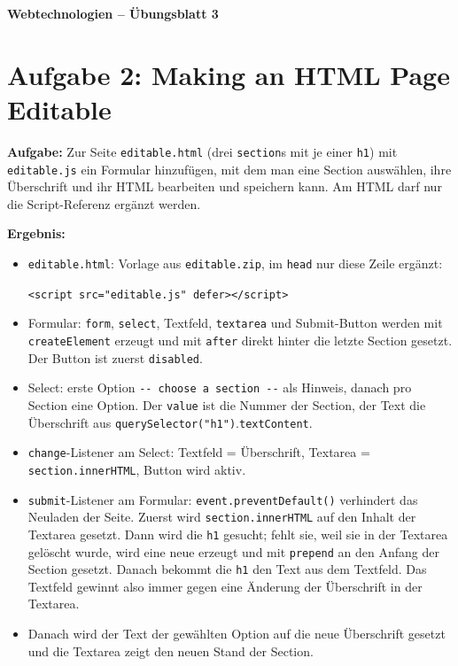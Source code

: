 \documentclass[11pt,a4paper]{article}
\begin{document}
\begin{center}
  {\Large\textbf{Webtechnologien -- Übungsblatt 3}}
\end{center}
\section*{Aufgabe 2: Making an HTML Page Editable}
\textbf{Aufgabe:} Zur Seite \texttt{editable.html} (drei
\texttt{section}s mit je einer \texttt{h1}) mit \texttt{editable.js} ein
Formular hinzufügen, mit dem man eine Section auswählen, ihre Überschrift
und ihr HTML bearbeiten und speichern kann. Am HTML darf nur die
Script-Referenz ergänzt werden.

\medskip
\textbf{Ergebnis:}
\begin{itemize}
  \item \texttt{editable.html}: Vorlage aus \texttt{editable.zip}, im
    \texttt{head} nur diese Zeile ergänzt:
    \begin{center}
    \texttt{<script src="editable.js" defer></script>}
    \end{center}
  \item Formular: \texttt{form}, \texttt{select}, Textfeld,
    \texttt{textarea} und Submit-Button werden mit
    \texttt{createElement} erzeugt und mit \texttt{after} direkt hinter die letzte Section gesetzt.
    Der Button ist zuerst \texttt{disabled}.
  \item Select: erste Option \glqq\texttt{-{}- choose a section -{}-}\grqq{}
    als Hinweis, danach pro Section eine Option. Der \texttt{value} ist
    die Nummer der Section, der Text die Überschrift aus
    \texttt{querySelector("h1")}.\allowbreak\texttt{textContent}.
  \item \texttt{change}-Listener am Select: Textfeld = Überschrift,
    Textarea = \texttt{section.innerHTML}, Button wird aktiv.
  \item \texttt{submit}-Listener am Formular:
    \texttt{event.preventDefault()} verhindert das Neuladen der Seite.
    Zuerst wird \texttt{section.innerHTML} auf den Inhalt der Textarea
    gesetzt. Dann wird die \texttt{h1} gesucht; fehlt sie, weil sie in der
    Textarea gelöscht wurde, wird eine neue erzeugt und mit
    \texttt{prepend} an den Anfang der Section gesetzt. Danach bekommt die
    \texttt{h1} den Text aus dem Textfeld. Das Textfeld gewinnt also immer
    gegen eine Änderung der Überschrift in der Textarea.
  \item Danach wird der Text der gewählten Option auf die neue Überschrift
    gesetzt und die Textarea zeigt den neuen Stand der Section.
\end{itemize}
\end{document}
